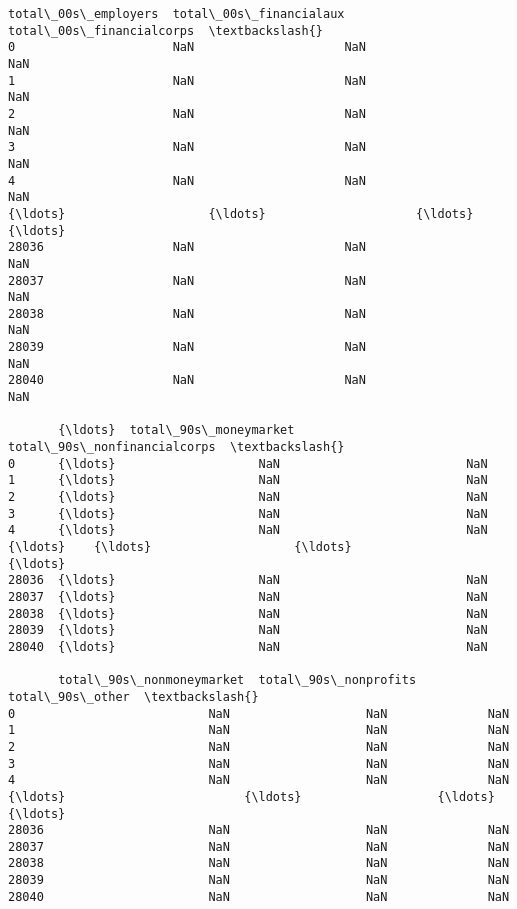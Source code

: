 \documentclass[11pt]{article}
\begin{document}
\begin{Verbatim}[commandchars=\\\{\}]
       total\_00s\_employers  total\_00s\_financialaux  total\_00s\_financialcorps  \textbackslash{}
0                      NaN                     NaN                       NaN
1                      NaN                     NaN                       NaN
2                      NaN                     NaN                       NaN
3                      NaN                     NaN                       NaN
4                      NaN                     NaN                       NaN
{\ldots}                    {\ldots}                     {\ldots}                       {\ldots}
28036                  NaN                     NaN                       NaN
28037                  NaN                     NaN                       NaN
28038                  NaN                     NaN                       NaN
28039                  NaN                     NaN                       NaN
28040                  NaN                     NaN                       NaN

       {\ldots}  total\_90s\_moneymarket  total\_90s\_nonfinancialcorps  \textbackslash{}
0      {\ldots}                    NaN                          NaN
1      {\ldots}                    NaN                          NaN
2      {\ldots}                    NaN                          NaN
3      {\ldots}                    NaN                          NaN
4      {\ldots}                    NaN                          NaN
{\ldots}    {\ldots}                    {\ldots}                          {\ldots}
28036  {\ldots}                    NaN                          NaN
28037  {\ldots}                    NaN                          NaN
28038  {\ldots}                    NaN                          NaN
28039  {\ldots}                    NaN                          NaN
28040  {\ldots}                    NaN                          NaN

       total\_90s\_nonmoneymarket  total\_90s\_nonprofits  total\_90s\_other  \textbackslash{}
0                           NaN                   NaN              NaN
1                           NaN                   NaN              NaN
2                           NaN                   NaN              NaN
3                           NaN                   NaN              NaN
4                           NaN                   NaN              NaN
{\ldots}                         {\ldots}                   {\ldots}              {\ldots}
28036                       NaN                   NaN              NaN
28037                       NaN                   NaN              NaN
28038                       NaN                   NaN              NaN
28039                       NaN                   NaN              NaN
28040                       NaN                   NaN              NaN


\end{Verbatim}
\end{document}
